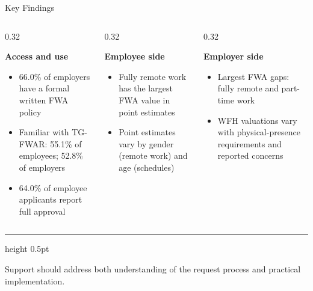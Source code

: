 \documentclass[aspectratio=169,11pt]{beamer}
\newcommand{\PolicyShare}{66.0}
\newcommand{\PanelTitle}[2]{%
  {\color{#1}\fontsize{12.5}{15}\selectfont
   \bfseries #2\par}
  \vspace{0.06cm}
}
\newcommand{\Takeaway}[1]{%
  \par\vspace{0.08cm}
  {\color{Rule}\hrule height 0.5pt}
  \vspace{0.08cm}
  {\color{Navy}\fontsize{11}{13.5}\selectfont\bfseries
   \hyphenpenalty=10000\exhyphenpenalty=10000
   \raggedright #1\par}
}
\begin{document}
\begin{frame}[t]{Key Findings}


\begin{columns}[T,onlytextwidth]

\begin{column}{0.32\textwidth}

\PanelTitle{Navy}{Access and use}

{\raggedright
\begin{itemize}
  \setlength{\itemsep}{0.16cm}
  \item \PolicyShare\% of employers have a formal written FWA policy
  \item Familiar with TG-FWAR:
        55.1\% of employees; 52.8\% of employers
  \item 64.0\% of employee applicants report full approval
\end{itemize}
}

\end{column}

\begin{column}{0.32\textwidth}

\PanelTitle{Employee}{Employee side}

{\raggedright
\begin{itemize}
  \setlength{\itemsep}{0.16cm}
  \item Fully remote work has the largest FWA value
        in point estimates
  \item Point estimates vary by gender (remote work)
        and age (schedules)
\end{itemize}
}

\end{column}

\begin{column}{0.32\textwidth}

\PanelTitle{Employer}{Employer side}

{\raggedright
\begin{itemize}
  \setlength{\itemsep}{0.16cm}
  \item Largest FWA gaps: fully remote and part-time work
  \item WFH valuations vary with physical-presence requirements
        and reported concerns
\end{itemize}
}

\end{column}

\end{columns}

\vfill

\Takeaway{
Support should address both understanding of the request process
and practical implementation.
}

\end{frame}
\end{document}
